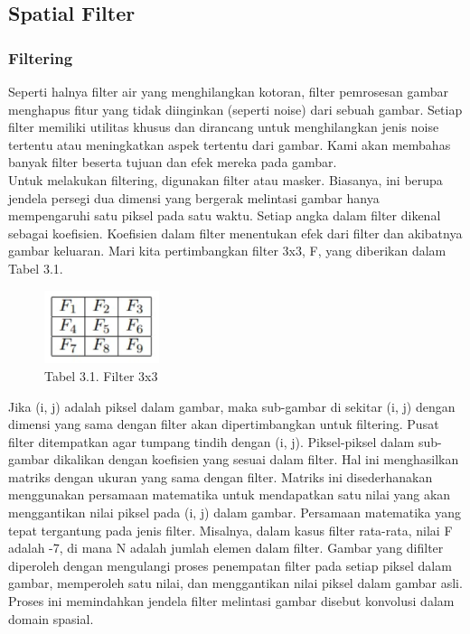 \documentclass[
  letterpaper,
  DIV=11,
  numbers=noendperiod]{scrreprt}
\begin{document}
\hypertarget{spatial-filter}{%
\subsection*{Spatial Filter}\label{spatial-filter}}

\hypertarget{filtering}{%
\subsubsection*{Filtering}\label{filtering}}

Seperti halnya filter air yang menghilangkan kotoran, filter pemrosesan
gambar menghapus fitur yang tidak diinginkan (seperti noise) dari sebuah
gambar. Setiap filter memiliki utilitas khusus dan dirancang untuk
menghilangkan jenis noise tertentu atau meningkatkan aspek tertentu dari
gambar. Kami akan membahas banyak filter beserta tujuan dan efek mereka
pada gambar.\\
Untuk melakukan filtering, digunakan filter atau masker. Biasanya, ini
berupa jendela persegi dua dimensi yang bergerak melintasi gambar hanya
mempengaruhi satu piksel pada satu waktu. Setiap angka dalam filter
dikenal sebagai koefisien. Koefisien dalam filter menentukan efek dari
filter dan akibatnya gambar keluaran. Mari kita pertimbangkan filter
3x3, F, yang diberikan dalam Tabel 3.1.

\begin{figure}

{\centering \includegraphics[width=0.3\textwidth,height=\textheight]{Asset/image1116.png}

}

\caption{Tabel 3.1. Filter 3x3}

\end{figure}

Jika (i, j) adalah piksel dalam gambar, maka sub-gambar di sekitar (i,
j) dengan dimensi yang sama dengan filter akan dipertimbangkan untuk
filtering. Pusat filter ditempatkan agar tumpang tindih dengan (i, j).
Piksel-piksel dalam sub-gambar dikalikan dengan koefisien yang sesuai
dalam filter. Hal ini menghasilkan matriks dengan ukuran yang sama
dengan filter. Matriks ini disederhanakan menggunakan persamaan
matematika untuk mendapatkan satu nilai yang akan menggantikan nilai
piksel pada (i, j) dalam gambar. Persamaan matematika yang tepat
tergantung pada jenis filter. Misalnya, dalam kasus filter rata-rata,
nilai F adalah -7, di mana N adalah jumlah elemen dalam filter. Gambar
yang difilter diperoleh dengan mengulangi proses penempatan filter pada
setiap piksel dalam gambar, memperoleh satu nilai, dan menggantikan
nilai piksel dalam gambar asli. Proses ini memindahkan jendela filter
melintasi gambar disebut konvolusi dalam domain spasial.
\end{document}
